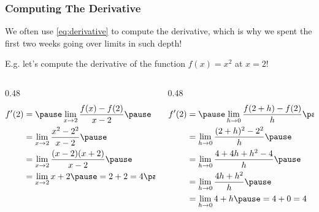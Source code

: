 \documentclass{ltx-talk}
\begin{document}
\begin{frame}
  \frametitle{Computing The Derivative}
  We often use \autoref{eq:derivative} to compute the derivative, \pause
  which is why we spent the first two weeks going over limits in such depth! \pause

  E.g. let's compute the derivative of the function $f(x) = x^2$ at $x = 2$! \pause

  \begin{columns}
    \begin{column}{0.48\textwidth}
      \begin{align}
        f'(2) &= \pause \lim\limits_{x \rightarrow 2} \dfrac{f(x) - f(2)}{x - 2} \pause \\
              &= \lim\limits_{x \rightarrow 2} \dfrac{x^2 - 2^2}{x - 2} \pause \\
              &= \lim\limits_{x \rightarrow 2} \dfrac{(x - 2)(x + 2)}{x - 2} \pause \\
              &= \lim\limits_{x \rightarrow 2} x + 2 \pause = 2 + 2 = 4 \pause
      \end{align}
    \end{column} 
    \begin{column}{0.48\textwidth}
      \begin{align}
        f'(2) &= \pause \lim\limits_{h \rightarrow 0} \dfrac{f(2 + h) - f(2)}{h} \pause \\
              &= \lim\limits_{h \rightarrow 0} \dfrac{(2 + h)^2 - 2^2}{h} \pause \\
              &= \lim\limits_{h \rightarrow 0} \dfrac{4 + 4h + h^2 - 4}{h} \pause \\
              &= \lim\limits_{h \rightarrow 0} \dfrac{4h + h^2}{h} \pause \\
              &= \lim\limits_{h \rightarrow 0} 4 + h \pause = 4 + 0 = 4
      \end{align}
    \end{column}
  \end{columns}
\end{frame}
\end{document}
